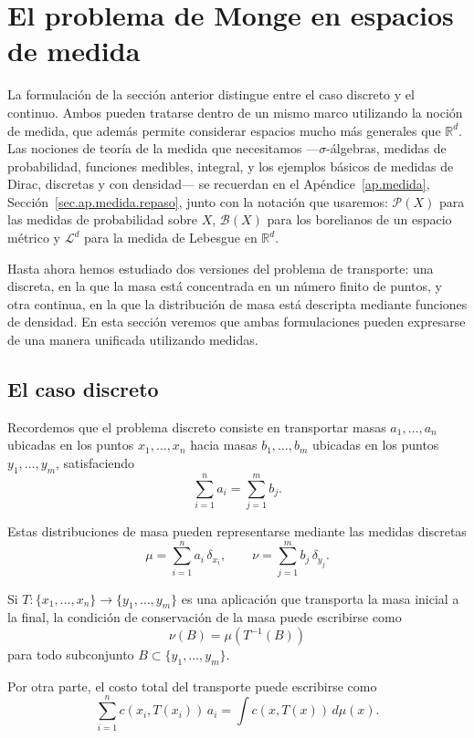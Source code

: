 \documentclass[12pt, a4paper]{amsbook}
\theoremstyle{remark}
\theoremstyle{definition}
\numberwithin{section}{chapter}
\numberwithin{subsection}{section}
\numberwithin{equation}{section}
\numberwithin{figure}{chapter}
\begin{document}
\section{El problema de Monge en espacios de medida}\label{sec.monge.medidas}

La formulación de la sección anterior distingue entre el caso discreto y el
continuo. Ambos pueden tratarse dentro de un mismo marco utilizando la noción
de medida, que además permite considerar espacios mucho más generales que
$\mathbb R^d$. Las nociones de teoría de la medida que necesitamos
---$\sigma$-álgebras, medidas de probabilidad, funciones medibles, integral,
y los ejemplos básicos de medidas de Dirac, discretas y con densidad--- se
recuerdan en el Apéndice~\ref{ap.medida}, Sección~\ref{sec.ap.medida.repaso},
junto con la notación que usaremos: $\mathcal P(X)$ para las medidas de
probabilidad sobre $X$, $\mathcal B(X)$ para los borelianos de un espacio
métrico y $\mathcal L^d$ para la medida de Lebesgue en $\mathbb R^d$.


Hasta ahora hemos estudiado dos versiones del problema de transporte: una discreta, en la que la masa está concentrada en un número finito de puntos, y otra continua, en la que la distribución de masa está descripta mediante funciones de densidad. En esta sección veremos que ambas formulaciones pueden expresarse de una manera unificada utilizando medidas.

\subsection{El caso discreto}

Recordemos que el problema discreto consiste en transportar masas \(a_1,\dots,a_n\) ubicadas en los puntos \(x_1,\dots,x_n\) hacia masas \(b_1,\dots,b_m\) ubicadas en los puntos \(y_1,\dots,y_m\), satisfaciendo
\[
\sum_{i=1}^n a_i=\sum_{j=1}^m b_j.
\]

Estas distribuciones de masa pueden representarse mediante las medidas discretas
\[
\mu=\sum_{i=1}^n a_i\,\delta_{x_i},
\qquad
\nu=\sum_{j=1}^m b_j\,\delta_{y_j}.
\]

Si \(T\colon\{x_1,\dots,x_n\}\to\{y_1,\dots,y_m\}\) es una aplicación que transporta la masa inicial a la final, la condición de conservación de la masa puede escribirse como
\[
\nu(B)=\mu(T^{-1}(B))
\]
para todo subconjunto \(B\subset\{y_1,\dots,y_m\}\).

Por otra parte, el costo total del transporte puede escribirse como
\[
\sum_{i=1}^n c(x_i,T(x_i))\,a_i
=
\int c(x,T(x))\,d\mu(x).
\]
\end{document}
